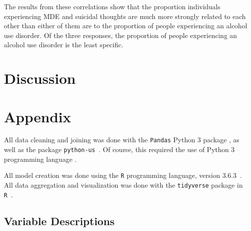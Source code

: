 \documentclass{article}
\begin{document}
The results from these correlations show that the proportion individuals
experiencing MDE and suicidal thoughts are much more strongly related to each
other than either of them are to the proportion of people experiencing
an alcohol use disorder.
Of the three responses, the proportion of people experiencing an
alcohol use disorder is the least specific.


\section{Discussion}

\section{Appendix}

All data cleaning and joining was done with the \texttt{Pandas} Python 3 package
\cite{python_pandas}, as well as the package \texttt{python-us}~\cite{python_us}.
Of course, this required the use of Python 3 programming language
\cite{python_lang}.

All model creation was done using the \texttt{R} programming
language, version 3.6.3~\cite{r_lang}.
All data aggregation and visualization was done with the
\texttt{tidyverse} package in \texttt{R}~\cite{r_tidyverse}.

\subsection{Variable Descriptions}\label{sec:variables}

\newcommand\censuscodes{https://www.census.gov/programs-surveys/acs/technical-documentation/code-lists.2018.html}
\newcommand\descentdesc[1]{ Proportion of the population which is of
    #1 descent. See \url{\censuscodes} for more
    pecise definitions.}
\newcommand\descentreason{Ethnicity is tied to socioeconomic status, which
    could in turn be correlated to one's financial status and mental health.
    Variables related to ethnicity were included to control for variation.}
\newcommand\agedescto[2]{Proportion of the population from #1 to #2 years old.}
\newcommand\agedescover[1]{Proportion of the population over #1 years old.}
\newcommand\agereason{Overall economic status could vary with age, so age
    variables were included to control for variation.}
\newcommand\educationdesc[1]{Proportion of the population 25 years of age and
    over whose maximum educational attainment is #1.}
\newcommand\educationreason{Educational attainment can be used as a general
    measure of socioeconomic status. Variables related to educational
    attainment were included to account for variation.}
\newcommand\maritaldesc[1]{Proportion of the population age 15 and older who
    have marital status ``#1".}
\newcommand\maritalreason{Marital status reflects general socioeconomic status.
    Variables related to marital status are included to account for variation.}
\end{document}
